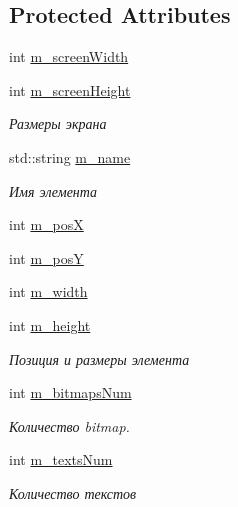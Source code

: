 \subsection*{Protected Attributes}
\begin{DoxyCompactItemize}
\item 
int \hyperlink{class_interface_element_class_a48d190b730dbfe3cde14dae381828c0a}{m\+\_\+screen\+Width}
\item 
int \hyperlink{class_interface_element_class_a67ebc91d7b5867dae25ef0d7246779dd}{m\+\_\+screen\+Height}
\begin{DoxyCompactList}\small\item\em Размеры экрана \end{DoxyCompactList}\item 
std\+::string \hyperlink{class_interface_element_class_aeb7bbd3373c67d0182643ac538f1d0c5}{m\+\_\+name}
\begin{DoxyCompactList}\small\item\em Имя элемента \end{DoxyCompactList}\item 
int \hyperlink{class_interface_element_class_a8eca1a33dad30ecbaf071529bf47b0b3}{m\+\_\+posX}
\item 
int \hyperlink{class_interface_element_class_ada43f9167fc56f5aca7ff0984171069a}{m\+\_\+posY}
\item 
int \hyperlink{class_interface_element_class_a0327b9790dee1416249b9cdedeb0154c}{m\+\_\+width}
\item 
int \hyperlink{class_interface_element_class_a4740f34c849aa414ad73862581cc239e}{m\+\_\+height}
\begin{DoxyCompactList}\small\item\em Позиция и размеры элемента \end{DoxyCompactList}\item 
int \hyperlink{class_interface_element_class_ac9e301c833f8291663c5beb125c26cc9}{m\+\_\+bitmaps\+Num}
\begin{DoxyCompactList}\small\item\em Количество bitmap. \end{DoxyCompactList}\item 
int \hyperlink{class_interface_element_class_abcea7224c180196b1eee96a4e0e61ea2}{m\+\_\+texts\+Num}
\begin{DoxyCompactList}\small\item\em Количество текстов \end{DoxyCompactList}\item 

\end{DoxyCompactItemize}
